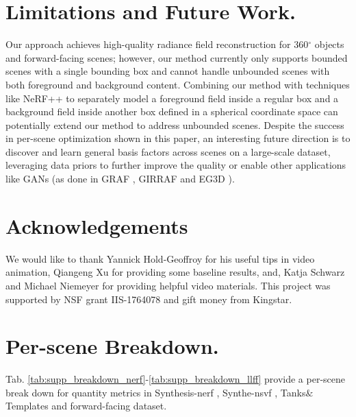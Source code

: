 \documentclass[runningheads]{llncs}
\begin{document}
\section{Limitations and Future Work.}
Our approach achieves high-quality radiance field reconstruction for 360$^\circ$ objects and forward-facing scenes; however, our method currently only supports bounded scenes with a single bounding box and cannot handle unbounded scenes with both foreground and background content. 
Combining our method with techniques like NeRF++ \cite{zhang2020nerf++} to separately model a foreground field inside a regular box and a background field inside another box defined in a spherical coordinate space can potentially extend our method to address unbounded scenes.
Despite the success in per-scene optimization shown in this paper, 
an interesting future direction is to discover and learn general basis factors across scenes on a large-scale dataset, leveraging data priors to further improve the quality or enable other applications like GANs (as done in GRAF \cite{schwarz2020graf}, GIRRAF \cite{niemeyer2021giraffe} and EG3D \cite{Chan2022EG3D}).



\section{Acknowledgements}
We would like to thank Yannick Hold-Geoffroy for his useful tips in video animation, Qiangeng Xu for providing some baseline results, and, Katja Schwarz and Michael Niemeyer for providing helpful video materials. This project was supported by NSF grant IIS-1764078 and gift money from Kingstar. 

\section{Per-scene Breakdown.}
\label{sec:perscene}

Tab. \ref{tab:supp_breakdown_nerf}-\ref{tab:supp_breakdown_llff} provide a per-scene break down for quantity metrics in Synthesis-nerf \cite{martin2021nerf}, Synthe-nsvf \cite{liu2020neural}, Tanks$\&$Templates \cite{Knapitsch2017} and forward-facing \cite{llff} dataset.
\end{document}
